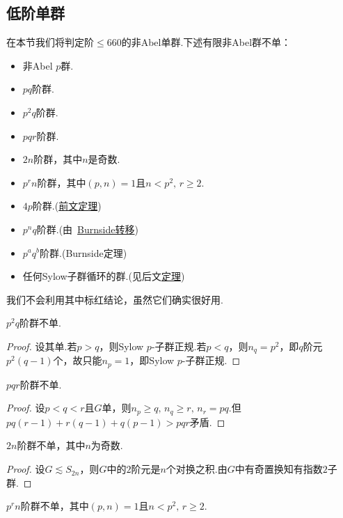 \subsection{低阶单群}\label{subsec:SimpleGrpLowOrder}
在本节我们将判定阶$\le 660$的非Abel单群.下述有限非Abel群不单：
\begin{itemize}
	\item 非Abel $p$群.
	\item $pq$阶群.
	\item $p^2q$阶群.
	\item $pqr$阶群.
	\item $2n$阶群，其中$n$是奇数.
	\item $p^rn$阶群，其中$(p,n)=1$且$n<p^2,\,r\ge 2$.
	\item[{\color{red}\textbullet}] $4p$阶群.(\hyperlink{prop:4pGroupStruc}{前文定理})
	\item[{\color{red}\textbullet}] $p^nq$阶群.(由~\hyperlink{thm:BurnsideNormalpComplement}{Burnside转移})
	\item[{\color{red}\textbullet}] $p^aq^b$阶群.(Burnside定理)
	\item[{\color{red}\textbullet}] 任何Sylow子群循环的群.(见后文\hyperlink{thm:CyclicSylowMetacyclic}{定理})
\end{itemize}
\begin{remark}
	我们不会利用其中标红结论，虽然它们确实很好用.
\end{remark}
\begin{lemma}
	$p^2q$阶群不单.
\end{lemma}
\begin{proof}
	设其单.若$p>q$，则Sylow $p$-子群正规.若$p<q$，则$n_q=p^2$，即$q$阶元$p^2(q-1)$个，故只能$n_p=1$，即Sylow $p$-子群正规.
\end{proof}
\begin{lemma}
	$pqr$阶群不单.
\end{lemma}
\begin{proof}
	设$p<q<r$且$G$单，则$n_p\ge q,\,n_q\ge r,\,n_r=pq$.但$pq(r-1)+r(q-1)+q(p-1)>pqr$矛盾.
\end{proof}
\begin{lemma}
	$2n$阶群不单，其中$n$为奇数.
\end{lemma}
\begin{proof}
	设$G\lesssim S_{2n}$，则$G$中的$2$阶元是$n$个对换之积.由$G$中有奇置换知有指数$2$子群.
\end{proof}
\begin{lemma*}
	$p^rn$阶群不单，其中$(p,n)=1$且$n<p^2,\,r\ge 2$.\hypertarget{lemma:p^rnNSimple}{}
\end{lemma*}
